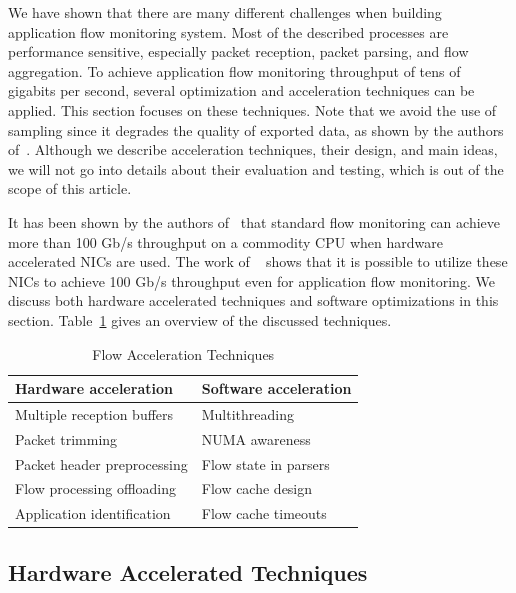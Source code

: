We have shown that there are many different challenges when building application flow monitoring system. Most of the described processes are performance sensitive, especially packet reception, packet parsing, and flow aggregation. To achieve application flow monitoring throughput of tens of gigabits per second, several optimization and acceleration techniques can be applied. This section focuses on these techniques. Note that we avoid the use of sampling since it degrades the quality of exported data, as shown by the authors of~\cite{Brauckhoff-2006-Impact}. Although we describe acceleration techniques, their design, and main ideas, we will not go into details about their evaluation and testing, which is out of the scope of this article. 

It has been shown by the authors of~\cite{Velan-2015-High} that standard flow monitoring can achieve more than 100 Gb/s throughput on a commodity CPU when hardware accelerated NICs are used. The work of \citeauthor{Kekely-2016-Software}~\cite{Kekely-2016-Software} shows that it is possible to utilize these NICs to achieve 100 Gb/s throughput even for application flow monitoring. We discuss both hardware accelerated techniques and software optimizations in this section. Table~\ref{tab:flow-acc-techniques} gives an overview of the discussed techniques.


\begin{table}[ht!]
	\centering
	\begin{tabular}{|l|l|}
	\hline
	\textbf{Hardware acceleration} & \textbf{Software acceleration} \\ \hline
	Multiple reception buffers & Multithreading \\
	Packet trimming & NUMA awareness \\
	Packet header preprocessing & Flow state in parsers \\
	Flow processing offloading & Flow cache design \\
	Application identification & Flow cache timeouts \\ \hline
	\end{tabular}
	\caption{Flow Acceleration Techniques}
	\label{tab:flow-acc-techniques}
\end{table}


\subsection{Hardware Accelerated Techniques}


